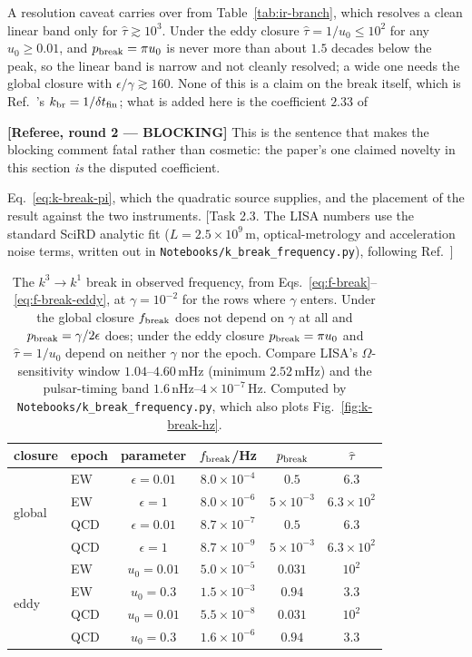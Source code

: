 \documentclass[10pt,prd,aps,nobibnotes,superscriptaddress,preprintnumbers,notitlepage]{revtex4-1}
\newcommand{\revX}[1]{\par\noindent\begin{tcolorbox}[colback=red!5,colframe=red!70!black,
    boxrule=1pt,left=3pt,right=3pt,top=2pt,bottom=2pt,breakable]
    \footnotesize\textcolor{red!70!black}{\textbf{[Referee, round 2 --- BLOCKING]} #1}\end{tcolorbox}\par}
\newcommand{\why}[1]{{\color{red}\footnotesize\textsf{[#1]}}}
\newcommand{\why}[1]{}
\begin{document}
{A resolution caveat carries over from Table~\ref{tab:ir-branch}, which resolves a clean
linear band only for $\hat\tau\gtrsim10^{3}$. Under the eddy closure
$\hat\tau=1/u_0\le10^{2}$ for any $u_0\ge0.01$, and $p_{\rm break}=\pi u_0$ is never more
than about $1.5$ decades below the peak, so the linear band is narrow and not cleanly
resolved; a wide one needs the global closure with $\epsilon/\gamma\gtrsim160$. None of
this is a claim on the break itself, which is Ref.~\cite{RoperPol:2022iel}'s
$k_{\rm br}=1/\delta t_{\rm fin}$; what is added here is the coefficient $2.33$ of
\revX{This is the sentence that makes the blocking comment fatal rather than cosmetic:
the paper's one claimed novelty in this section \emph{is} the disputed coefficient.}
Eq.~\eqref{eq:k-break-pi}, which the quadratic source supplies, and the placement of the
result against the two instruments.
\why{Task 2.3. The LISA numbers use the standard SciRD analytic fit
($L=2.5\times10^{9}\,$m, optical-metrology and acceleration noise terms, written out in
\texttt{Notebooks/k\_break\_frequency.py}), following Ref.~\cite{Robson:2018ifk}}

\begin{table}[ht]
  \centering
  \begin{tabular}{@{}llcccc@{}}
  \hline\hline
  closure & epoch & parameter & $f_{\rm break}$/Hz & $p_{\rm break}$ & $\hat\tau$ \\
  \hline
  \multirow{4}{*}{global}
   & EW  & $\epsilon=0.01$ & $8.0\times10^{-4}$ & $0.5$ & $6.3$ \\
   & EW  & $\epsilon=1$    & $8.0\times10^{-6}$ & $5\times10^{-3}$ & $6.3\times10^{2}$ \\
   & QCD & $\epsilon=0.01$ & $8.7\times10^{-7}$ & $0.5$ & $6.3$ \\
   & QCD & $\epsilon=1$    & $8.7\times10^{-9}$ & $5\times10^{-3}$ & $6.3\times10^{2}$ \\
  \hline
  \multirow{4}{*}{eddy}
   & EW  & $u_0=0.01$ & $5.0\times10^{-5}$ & $0.031$ & $10^{2}$ \\
   & EW  & $u_0=0.3$  & $1.5\times10^{-3}$ & $0.94$  & $3.3$ \\
   & QCD & $u_0=0.01$ & $5.5\times10^{-8}$ & $0.031$ & $10^{2}$ \\
   & QCD & $u_0=0.3$  & $1.6\times10^{-6}$ & $0.94$  & $3.3$ \\
  \hline\hline
  \end{tabular}
  \caption{The $k^{3}\!\to\!k^{1}$ break in observed frequency, from
  Eqs.~\eqref{eq:f-break}--\eqref{eq:f-break-eddy}, at $\gamma=10^{-2}$ for the rows
  where $\gamma$ enters. Under the global closure $f_{\rm break}$ does not depend on
  $\gamma$ at all and $p_{\rm break}=\gamma/2\epsilon$ does; under the eddy closure
  $p_{\rm break}=\pi u_0$ and $\hat\tau=1/u_0$ depend on neither $\gamma$ nor the epoch.
  Compare LISA's $\Omega$-sensitivity window $1.04$--$4.60\,$mHz (minimum $2.52\,$mHz)
  and the pulsar-timing band $1.6\,$nHz--$4\times10^{-7}\,$Hz. Computed by
  \texttt{Notebooks/k\_break\_frequency.py}, which also plots
  Fig.~\ref{fig:k-break-hz}.}
  \label{tab:k-break-hz}
\end{table}

}
\end{document}
